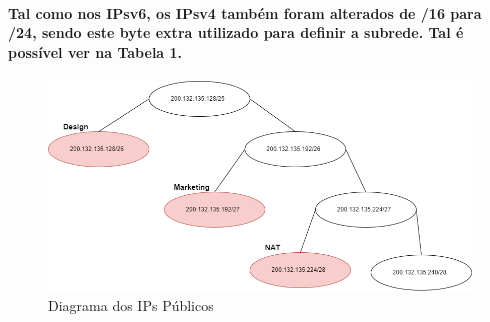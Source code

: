\documentclass{report}
\begin{document}
\paragraph{Tal como nos IPsv6, os IPsv4 também foram alterados de /16 para /24, sendo este byte extra utilizado para definir a subrede. Tal é possível ver na Tabela 1.}


\begin{figure}
    \centering
    \includegraphics[scale=0.5]{IPsPublicosDiagrama.png}
    \caption{Diagrama dos IPs Públicos}
    \label{fig:diagrama}
\end{figure}    
\end{document}
